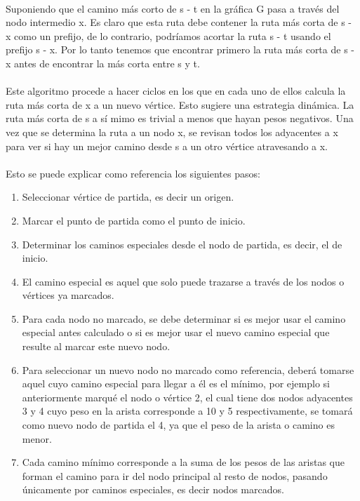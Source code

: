 \documentclass[11pt]{article}
\begin{document}
\paragraph{}
Suponiendo que el camino más corto de s - t en la gráfica G pasa a través del nodo intermedio x. Es claro que esta ruta debe contener la ruta más corta de s - x como un prefijo, de lo contrario, podríamos acortar la ruta s - t usando el prefijo s - x. Por lo tanto tenemos que encontrar primero la ruta más corta de s - x antes de encontrar la más corta entre s y t. 

\paragraph{}
Este algoritmo procede a hacer ciclos en los que en cada uno de ellos calcula la ruta más corta de x a un nuevo vértice. Esto sugiere una estrategia dinámica. La ruta más corta de s a sí mimo es trivial a menos que hayan pesos negativos. Una vez que se determina la ruta a un nodo x, se revisan todos los adyacentes a x para ver si hay un mejor camino desde s a un otro vértice atravesando a x.

\paragraph{}
Esto se puede explicar como referencia los siguientes pasos:

\begin{enumerate}
\item Seleccionar vértice de partida, es decir un origen.
\item Marcar el punto de partida como el punto de inicio.
\item Determinar los caminos especiales desde el nodo de partida, es decir, el de inicio.
\item El camino especial es aquel que solo puede trazarse a través de los nodos o vértices ya marcados.
\item Para  cada  nodo  no  marcado,  se  debe  determinar  si  es  mejor  usar  el  camino  especial antes calculado o si es mejor usar el nuevo camino especial que resulte al marcar este nuevo nodo.
\item Para  seleccionar  un  nuevo  nodo  no  marcado  como  referencia,  deberá  tomarse  aquel cuyo camino especial para llegar a él es el mínimo, por ejemplo si anteriormente marqué el  nodo  o  vértice  2,  el  cual  tiene  dos  nodos  adyacentes  3  y  4  cuyo  peso  en  la  arista corresponde a 10 y 5 respectivamente, se tomará como nuevo nodo de partida el 4, ya que el peso de la arista o camino es menor.
\item Cada camino mínimo corresponde a la suma de los pesos de las aristas que forman el camino para  ir  del  nodo  principal  al  resto  de  nodos,  pasando  únicamente  por  caminos especiales, es decir nodos marcados.
\end{enumerate}
\end{document}
